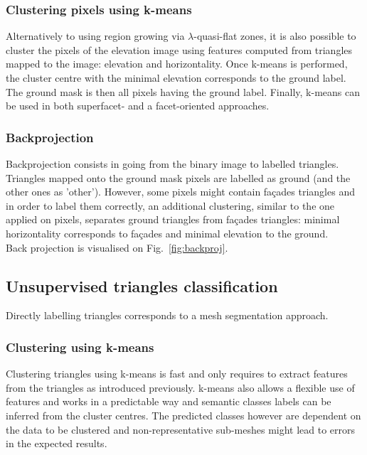 \documentclass{kththesis}
\begin{document}
\subsubsection{Clustering pixels using k-means}
Alternatively to using region growing via $\lambda$-quasi-flat zones, it is also possible to cluster the pixels of the elevation image using features computed from triangles mapped to the image: elevation and horizontality. Once k-means is performed, the cluster centre with the minimal elevation corresponds to the ground label. The ground mask is then all pixels having the ground label. Finally, k-means can be used in both superfacet- and a facet-oriented approaches.

\subsubsection{Backprojection}
Backprojection consists in going from the binary image to labelled triangles. Triangles mapped onto the ground mask pixels are labelled as ground (and the other ones as 'other'). However, some pixels might contain façades triangles and in order to label them correctly, an additional clustering, similar to the one applied on pixels, separates ground triangles from façades triangles: minimal horizontality corresponds to façades and minimal elevation to the ground.  \\
Back projection is visualised on Fig.~\ref{fig:backproj}.


\subsection{Unsupervised triangles classification}
\label{sec:meshseg}
Directly labelling triangles corresponds to a mesh segmentation approach. 
\subsubsection{Clustering using k-means}
Clustering triangles using k-means is fast and only requires to extract features from the triangles as introduced previously. k-means also allows a flexible use of features and works in a predictable way and semantic classes labels can be inferred from the cluster centres. The predicted classes however are dependent on the data to be clustered and non-representative sub-meshes might lead to errors in the expected results. 
\end{document}
